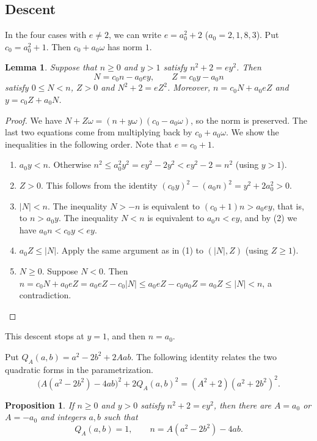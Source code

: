 \documentclass[a4paper,11pt]{article}
\theoremstyle{plain}
\newtheorem{proposition}[theorem]{Proposition}
\newtheorem{lemma}[theorem]{Lemma}
\theoremstyle{definition}
\theoremstyle{remark}
\numberwithin{equation}{section}
\numberwithin{table}{section}
\begin{document}
\subsection{Descent}

In the four cases with $e\ne2$, we can write $e=a_0^2+2$ ($a_0=2,1,8,3$).
Put $c_0=a_0^2+1$. Then $c_0+a_0\omega$ has norm $1$.

\begin{lemma}\label{lem:descent}
Suppose that $n\ge0$ and $y>1$ satisfy $n^2+2=ey^2$. Then
\[
N=c_0n-a_0ey,\qquad Z=c_0y-a_0n
\]
satisfy $0\le N<n$, $Z>0$ and $N^2+2=eZ^2$. Moreover, $n=c_0N+a_0eZ$ and $y=c_0Z+a_0N$.
\end{lemma}

\begin{proof}
We have $N+Z\omega=(n+y\omega)(c_0-a_0\omega)$, so the norm is preserved. The last two equations come from multiplying back by $c_0+a_0\omega$.
We show the inequalities in the following order. Note that $e=c_0+1$.
\begin{enumerate}
\item $a_0y<n$. Otherwise $n^2\le a_0^2y^2=ey^2-2y^2<ey^2-2=n^2$ (using $y>1$).
\item $Z>0$. This follows from the identity $(c_0y)^2-(a_0n)^2=y^2+2a_0^2>0$.
\item $|N|<n$. The inequality $N>-n$ is equivalent to $(c_0+1)n>a_0ey$, that is, to $n>a_0y$. The inequality $N<n$ is equivalent to $a_0n<ey$, and by (2) we have $a_0n<c_0y<ey$.
\item $a_0Z\le|N|$. Apply the same argument as in (1) to $(|N|,Z)$ (using $Z\ge1$).
\item $N\ge0$. Suppose $N<0$. Then $n=c_0N+a_0eZ=a_0eZ-c_0|N|\le a_0eZ-c_0a_0Z=a_0Z\le|N|<n$, a contradiction.
\end{enumerate}
\end{proof}

This descent stops at $y=1$, and then $n=a_0$.

Put $Q_A(a,b)=a^2-2b^2+2Aab$. The following identity relates the two quadratic forms in the parametrization.
\begin{equation}\label{eq:paramidentity}
\bigl(A(a^2-2b^2)-4ab\bigr)^2+2Q_A(a,b)^2=(A^2+2)(a^2+2b^2)^2.
\end{equation}

\begin{proposition}\label{prop:parameters}
If $n\ge0$ and $y>0$ satisfy $n^2+2=ey^2$, then there are $A=a_0$ or $A=-a_0$ and integers $a,b$ such that
\begin{equation}\label{eq:param}
Q_A(a,b)=1,\qquad n=A(a^2-2b^2)-4ab.
\end{equation}
\end{proposition}
\end{document}

